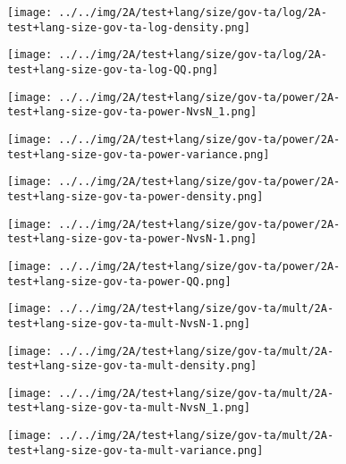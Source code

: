 \begin{figure}[H]
\centering	\texttt{[image: ../../img/2A/test+lang/size/gov-ta/log/2A-test+lang-size-gov-ta-log-density.png]}
\end{figure}
\begin{figure}[H]
\centering	\texttt{[image: ../../img/2A/test+lang/size/gov-ta/log/2A-test+lang-size-gov-ta-log-QQ.png]}
\end{figure}
\begin{figure}[H]
\centering	\texttt{[image: ../../img/2A/test+lang/size/gov-ta/power/2A-test+lang-size-gov-ta-power-NvsN\_1.png]}
\end{figure}
\begin{figure}[H]
\centering	\texttt{[image: ../../img/2A/test+lang/size/gov-ta/power/2A-test+lang-size-gov-ta-power-variance.png]}
\end{figure}
\begin{figure}[H]
\centering	\texttt{[image: ../../img/2A/test+lang/size/gov-ta/power/2A-test+lang-size-gov-ta-power-density.png]}
\end{figure}
\begin{figure}[H]
\centering	\texttt{[image: ../../img/2A/test+lang/size/gov-ta/power/2A-test+lang-size-gov-ta-power-NvsN-1.png]}
\end{figure}
\begin{figure}[H]
\centering	\texttt{[image: ../../img/2A/test+lang/size/gov-ta/power/2A-test+lang-size-gov-ta-power-QQ.png]}
\end{figure}
\begin{figure}[H]
\centering	\texttt{[image: ../../img/2A/test+lang/size/gov-ta/mult/2A-test+lang-size-gov-ta-mult-NvsN-1.png]}
\end{figure}
\begin{figure}[H]
\centering	\texttt{[image: ../../img/2A/test+lang/size/gov-ta/mult/2A-test+lang-size-gov-ta-mult-density.png]}
\end{figure}
\begin{figure}[H]
\centering	\texttt{[image: ../../img/2A/test+lang/size/gov-ta/mult/2A-test+lang-size-gov-ta-mult-NvsN\_1.png]}
\end{figure}
\begin{figure}[H]
\centering	\texttt{[image: ../../img/2A/test+lang/size/gov-ta/mult/2A-test+lang-size-gov-ta-mult-variance.png]}
\end{figure}
